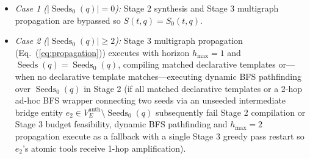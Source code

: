 \documentclass[conference,10pt]{IEEEtran}
\begin{document}
\begin{itemize}
    \item \emph{Case 1 ($|\operatorname{Seeds}_0(q)| = 0$):} Stage 2 synthesis and Stage 3 multigraph propagation are bypassed so $S(t, q) = S_0(t, q)$.
    \item \emph{Case 2 ($|\operatorname{Seeds}_0(q)| \ge 2$):} Stage 3 multigraph propagation (Eq.~(\ref{eq:propagation})) executes with horizon $h_{\max} = 1$ and $\operatorname{Seeds}(q) = \operatorname{Seeds}_0(q)$, compiling matched declarative templates or—when no declarative template matches—executing dynamic BFS pathfinding over $\operatorname{Seeds}_0(q)$ in Stage 2 (if all matched declarative templates or a 2-hop ad-hoc BFS wrapper connecting two seeds via an unseeded intermediate bridge entity $e_2 \in V_E^{\text{auth}} \setminus \operatorname{Seeds}_0(q)$ subsequently fail Stage 2 compilation or Stage 3 budget feasibility, dynamic BFS pathfinding and $h_{\max} = 2$ propagation execute as a fallback with a single Stage 3 greedy pass restart so $e_2$'s atomic tools receive 1-hop amplification).

\end{itemize}
\end{document}

